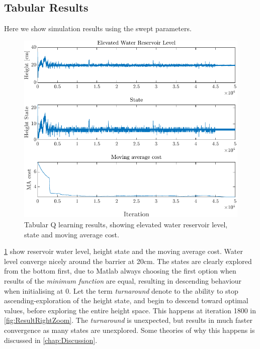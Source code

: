 \newpage \clearpage

\subsection{Tabular Results}
Here we show simulation results using the swept parameters.

\begin{figure}[h!]
	\centering
	\includegraphics[width=0.7\linewidth]{figures/TabularResults2.pdf}
	\caption{Tabular Q learning results, showing elevated water reservoir level, state and moving average cost.}
	\label{fig:Tabularresults1}
\end{figure} 

\cref{fig:Tabularresults1} show reservoir water level, height state and the moving average cost. Water level converge nicely around the barrier at 20\si{cm}. The states are clearly explored from the bottom first, due to Matlab always choosing the first option when results of the \textit{minimum function} are equal, resulting in descending behaviour when initialising at 0. Let the term \textit{turnaround} denote to the ability to stop ascending-exploration of the height state, and begin to descend toward optimal values, before exploring the entire height space. This happens at iteration 1800 in \cref{fig:ResultRightZoom}. The \textit{turnaround} is unexpected, but results in much faster convergence as many states are unexplored. Some theories of why this happens is discussed in \cref{chap:Discussion}.

